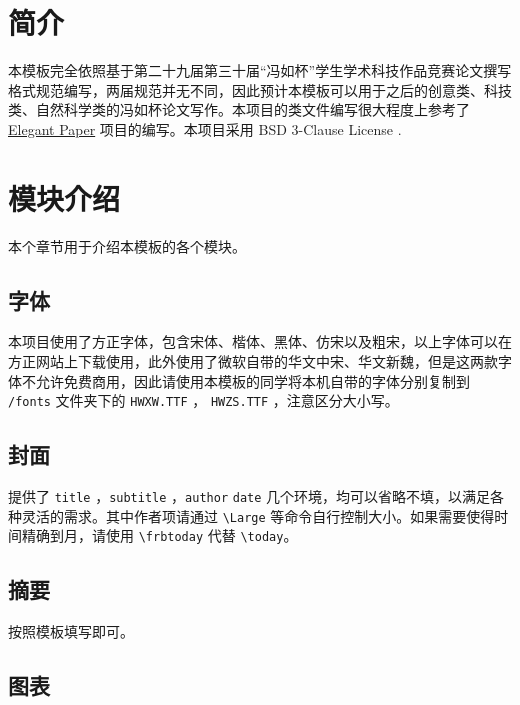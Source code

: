 \documentclass[lang=cn,12pt]{frbpaper}
\begin{document}
\clearpage


\tableofcontents
\clearpage


\makemain

\section{简介}

本模板完全依照基于第二十九届第三十届“冯如杯”学生学术科技作品竞赛论文撰写格式规范编写，两届规范并无不同，因此预计本模板可以用于之后的创意类、科技类、自然科学类的冯如杯论文写作。本项目的类文件编写很大程度上参考了 \href{https://github.com/ElegantLaTeX/ElegantPaper}{Elegant Paper} 项目的编写。本项目采用  BSD 3-Clause License .

\section{模块介绍}

本个章节用于介绍本模板的各个模块。

\subsection{字体}

本项目使用了方正字体，包含宋体、楷体、黑体、仿宋以及粗宋，以上字体可以在方正网站上下载使用，此外使用了微软自带的华文中宋、华文新魏，但是这两款字体不允许免费商用，因此请使用本模板的同学将本机自带的字体分别复制到  \lstinline{/fonts} 文件夹下的 \lstinline{HWXW.TTF} ， \lstinline{HWZS.TTF} ，注意区分大小写。

\subsection{封面}

提供了 \lstinline{title} ，\lstinline{subtitle} ，\lstinline{author} \lstinline{date} 几个环境，均可以省略不填，以满足各种灵活的需求。其中作者项请通过 \lstinline{\Large} 等命令自行控制大小。如果需要使得时间精确到月，请使用 \lstinline{\frbtoday} 代替 \lstinline{\today}。

\subsection{摘要}

按照模板填写即可。

\subsection{图表}
\end{document}
